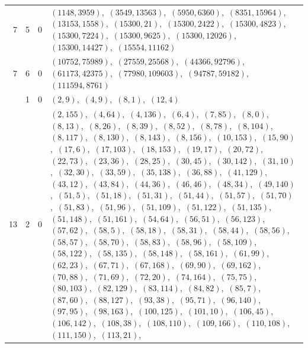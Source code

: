\documentclass[11pt]{article}
\begin{document}
\begin{longtable}{@{}rrl>{\raggedright\arraybackslash}p{}@{}}
7 & 5 & $0$ & $(1148,3959)$,\allowbreak\ $(3549,13563)$,\allowbreak\ $(5950,6360)$,\allowbreak\ $(8351,15964)$,\allowbreak\ $(13153,1558)$,\allowbreak\ $(15300,21)$,\allowbreak\ $(15300,2422)$,\allowbreak\ $(15300,4823)$,\allowbreak\ $(15300,7224)$,\allowbreak\ $(15300,9625)$,\allowbreak\ $(15300,12026)$,\allowbreak\ $(15300,14427)$,\allowbreak\ $(15554,11162)$\\
7 & 6 & $0$ & $(10752,75989)$,\allowbreak\ $(27559,25568)$,\allowbreak\ $(44366,92796)$,\allowbreak\ $(61173,42375)$,\allowbreak\ $(77980,109603)$,\allowbreak\ $(94787,59182)$,\allowbreak\ $(111594,8761)$\\
\addlinespace[3pt]
13 & 1 & $0$ & $(2,9)$,\allowbreak\ $(4,9)$,\allowbreak\ $(8,1)$,\allowbreak\ $(12,4)$\\
13 & 2 & $0$ & $(2,155)$,\allowbreak\ $(4,64)$,\allowbreak\ $(4,136)$,\allowbreak\ $(6,4)$,\allowbreak\ $(7,85)$,\allowbreak\ $(8,0)$,\allowbreak\ $(8,13)$,\allowbreak\ $(8,26)$,\allowbreak\ $(8,39)$,\allowbreak\ $(8,52)$,\allowbreak\ $(8,78)$,\allowbreak\ $(8,104)$,\allowbreak\ $(8,117)$,\allowbreak\ $(8,130)$,\allowbreak\ $(8,143)$,\allowbreak\ $(8,156)$,\allowbreak\ $(10,153)$,\allowbreak\ $(15,90)$,\allowbreak\ $(17,6)$,\allowbreak\ $(17,103)$,\allowbreak\ $(18,153)$,\allowbreak\ $(19,17)$,\allowbreak\ $(20,72)$,\allowbreak\ $(22,73)$,\allowbreak\ $(23,36)$,\allowbreak\ $(28,25)$,\allowbreak\ $(30,45)$,\allowbreak\ $(30,142)$,\allowbreak\ $(31,10)$,\allowbreak\ $(32,30)$,\allowbreak\ $(33,59)$,\allowbreak\ $(35,138)$,\allowbreak\ $(36,88)$,\allowbreak\ $(41,129)$,\allowbreak\ $(43,12)$,\allowbreak\ $(43,84)$,\allowbreak\ $(44,36)$,\allowbreak\ $(46,46)$,\allowbreak\ $(48,34)$,\allowbreak\ $(49,140)$,\allowbreak\ $(51,5)$,\allowbreak\ $(51,18)$,\allowbreak\ $(51,31)$,\allowbreak\ $(51,44)$,\allowbreak\ $(51,57)$,\allowbreak\ $(51,70)$,\allowbreak\ $(51,83)$,\allowbreak\ $(51,96)$,\allowbreak\ $(51,109)$,\allowbreak\ $(51,122)$,\allowbreak\ $(51,135)$,\allowbreak\ $(51,148)$,\allowbreak\ $(51,161)$,\allowbreak\ $(54,64)$,\allowbreak\ $(56,51)$,\allowbreak\ $(56,123)$,\allowbreak\ $(57,62)$,\allowbreak\ $(58,5)$,\allowbreak\ $(58,18)$,\allowbreak\ $(58,31)$,\allowbreak\ $(58,44)$,\allowbreak\ $(58,56)$,\allowbreak\ $(58,57)$,\allowbreak\ $(58,70)$,\allowbreak\ $(58,83)$,\allowbreak\ $(58,96)$,\allowbreak\ $(58,109)$,\allowbreak\ $(58,122)$,\allowbreak\ $(58,135)$,\allowbreak\ $(58,148)$,\allowbreak\ $(58,161)$,\allowbreak\ $(61,99)$,\allowbreak\ $(62,23)$,\allowbreak\ $(67,71)$,\allowbreak\ $(67,168)$,\allowbreak\ $(69,90)$,\allowbreak\ $(69,162)$,\allowbreak\ $(70,88)$,\allowbreak\ $(71,69)$,\allowbreak\ $(72,20)$,\allowbreak\ $(74,164)$,\allowbreak\ $(75,75)$,\allowbreak\ $(80,103)$,\allowbreak\ $(82,129)$,\allowbreak\ $(83,114)$,\allowbreak\ $(84,82)$,\allowbreak\ $(85,7)$,\allowbreak\ $(87,60)$,\allowbreak\ $(88,127)$,\allowbreak\ $(93,38)$,\allowbreak\ $(95,71)$,\allowbreak\ $(96,140)$,\allowbreak\ $(97,95)$,\allowbreak\ $(98,163)$,\allowbreak\ $(100,125)$,\allowbreak\ $(101,10)$,\allowbreak\ $(106,45)$,\allowbreak\ $(106,142)$,\allowbreak\ $(108,38)$,\allowbreak\ $(108,110)$,\allowbreak\ $(109,166)$,\allowbreak\ $(110,108)$,\allowbreak\ $(111,150)$,\allowbreak\ $(113,21)$,\allowbreak\ 
\end{longtable}
\end{document}
